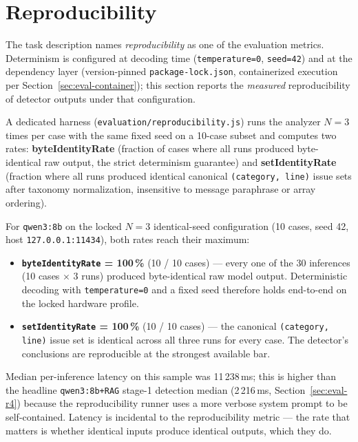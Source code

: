 \section{Reproducibility}
\label{sec:eval-reproducibility-metric}

The task description names \emph{reproducibility} as one of the evaluation
metrics. Determinism is configured at decoding time
(\texttt{temperature=0}, \texttt{seed=42}) and at the dependency layer
(version-pinned \texttt{package-lock.json}, containerized execution per
Section~\ref{sec:eval-container}); this section reports the
\emph{measured} reproducibility of detector outputs under that
configuration.

A dedicated harness (\texttt{evaluation/reproducibility.js}) runs the analyzer $N=3$ times per case with the same fixed seed on a 10-case subset and computes two rates: \textbf{byteIdentityRate} (fraction of cases where all runs produced byte-identical raw output, the strict determinism guarantee) and \textbf{setIdentityRate} (fraction where all runs produced identical canonical \texttt{(category, line)} issue sets after taxonomy normalization, insensitive to message paraphrase or array ordering).

For \texttt{qwen3:8b} on the locked $N=3$ identical-seed configuration
(10 cases, seed 42, host \texttt{127.0.0.1:11434}), both rates reach
their maximum:

\begin{itemize}
  \item \textbf{\texttt{byteIdentityRate} = 100\,\%} (10 / 10 cases) ---
        every one of the 30 inferences (10 cases $\times$ 3 runs) produced
        byte-identical raw model output. Deterministic decoding with
        \texttt{temperature=0} and a fixed seed therefore holds end-to-end
        on the locked hardware profile.
  \item \textbf{\texttt{setIdentityRate} = 100\,\%} (10 / 10 cases) ---
        the canonical \texttt{(category, line)} issue set is identical
        across all three runs for every case. The detector's conclusions
        are reproducible at the strongest available bar.
\end{itemize}

Median per-inference latency on this sample was 11\,238\,ms; this is
higher than the headline \texttt{qwen3:8b+RAG} stage-1 detection median
(2\,216\,ms, Section~\ref{sec:eval-r4}) because the reproducibility
runner uses a more verbose system prompt to be self-contained. Latency
is incidental to the reproducibility metric --- the rate that matters
is whether identical inputs produce identical outputs, which they do.

